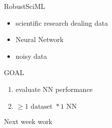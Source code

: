 \begin{frame}{RobustSciML}
        \begin{itemize}
                \item scientific research dealing data
                 \item Neural Network
                 \item noisy data
        \end{itemize}   
\end{frame}

 \begin{frame}{GOAL}
     \begin{enumerate}
         \item evaluate NN performance
         \item $\geq 1 \text{ dataset } * 1\text{ NN }$
     \end{enumerate}
 \end{frame}

\begin{frame}{}
        Next week work
\end{frame}




